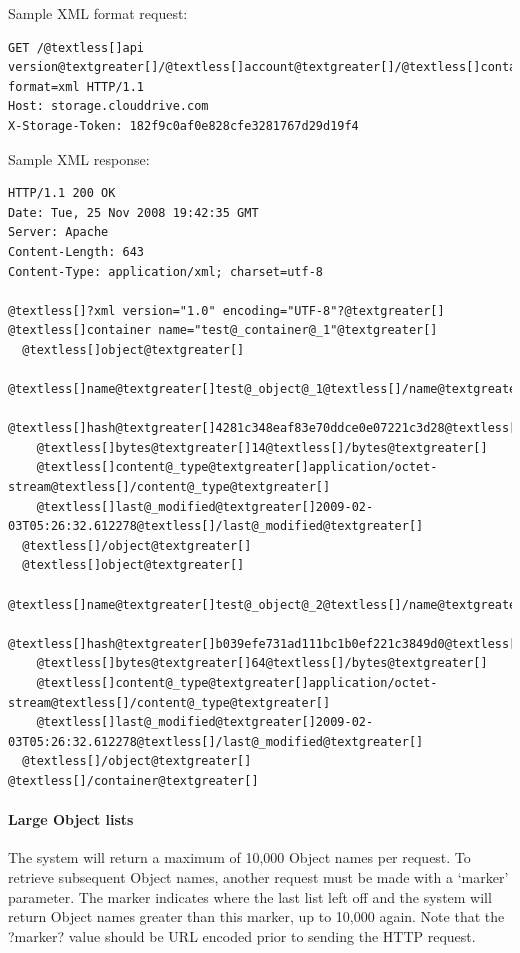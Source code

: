 \documentclass[letterpaper,10pt,english]{manual}
\begin{document}
Sample XML format request:

\begin{Verbatim}[commandchars=@\[\]]
GET /@textless[]api version@textgreater[]/@textless[]account@textgreater[]/@textless[]container@textgreater[]?format=xml HTTP/1.1
Host: storage.clouddrive.com
X-Storage-Token: 182f9c0af0e828cfe3281767d29d19f4
\end{Verbatim}

Sample XML response:

\begin{Verbatim}[commandchars=@\[\]]
HTTP/1.1 200 OK
Date: Tue, 25 Nov 2008 19:42:35 GMT
Server: Apache
Content-Length: 643
Content-Type: application/xml; charset=utf-8

@textless[]?xml version="1.0" encoding="UTF-8"?@textgreater[]
@textless[]container name="test@_container@_1"@textgreater[]
  @textless[]object@textgreater[]
    @textless[]name@textgreater[]test@_object@_1@textless[]/name@textgreater[]
    @textless[]hash@textgreater[]4281c348eaf83e70ddce0e07221c3d28@textless[]/hash@textgreater[]
    @textless[]bytes@textgreater[]14@textless[]/bytes@textgreater[]
    @textless[]content@_type@textgreater[]application/octet-stream@textless[]/content@_type@textgreater[]
    @textless[]last@_modified@textgreater[]2009-02-03T05:26:32.612278@textless[]/last@_modified@textgreater[]
  @textless[]/object@textgreater[]
  @textless[]object@textgreater[]
    @textless[]name@textgreater[]test@_object@_2@textless[]/name@textgreater[]
    @textless[]hash@textgreater[]b039efe731ad111bc1b0ef221c3849d0@textless[]/hash@textgreater[]
    @textless[]bytes@textgreater[]64@textless[]/bytes@textgreater[]
    @textless[]content@_type@textgreater[]application/octet-stream@textless[]/content@_type@textgreater[]
    @textless[]last@_modified@textgreater[]2009-02-03T05:26:32.612278@textless[]/last@_modified@textgreater[]
  @textless[]/object@textgreater[]
@textless[]/container@textgreater[]
\end{Verbatim}


\paragraph{Large Object lists}

The system will return a maximum of 10,000 Object names per request. To
retrieve subsequent Object names, another request must be made with a
`marker' parameter. The marker indicates where the last list left off
and the system will return Object names greater than this marker, up to
10,000 again.  Note that the ?marker? value should be URL encoded prior
to sending the HTTP request.
\end{document}
